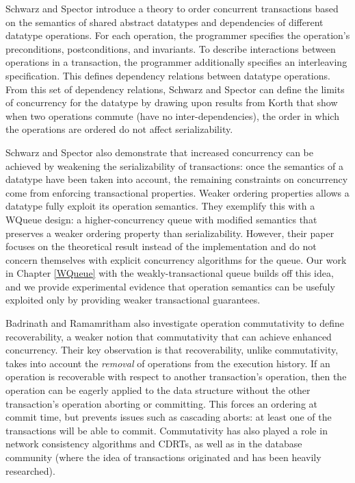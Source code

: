 Schwarz and Spector\cite{schwarz} introduce a theory to order concurrent transactions based on the semantics of shared abstract datatypes and dependencies of different datatype operations. For each operation, the programmer specifies the operation's preconditions, postconditions, and invariants. To describe interactions between operations in a transaction, the programmer additionally specifies an interleaving specification. This defines dependency relations between datatype operations. From this set of dependency relations, Schwarz and Spector can define the limits of concurrency for the datatype by drawing upon results from Korth\cite{korth} that show when two operations commute (have no inter-dependencies), the order in which the operations are ordered do not affect serializability. 

Schwarz and Spector also demonstrate that increased concurrency can be achieved by weakening the serializability of transactions: once the semantics of a datatype have been taken into account, the remaining constraints on concurrency come from enforcing transactional properties\cite{kung}. Weaker ordering properties allows a datatype fully exploit its operation semantics. They exemplify this with a WQueue design: a higher-concurrency queue with modified semantics that preserves a weaker ordering property than serializability. However, their paper focuses on the theoretical result instead of the implementation and do not concern themselves with explicit concurrency algorithms for the queue. Our work in Chapter \ref{WQueue} with the weakly-transactional queue builds off this idea, and we provide experimental evidence that operation semantics can be usefuly exploited only by providing weaker transactional guarantees.

Badrinath and Ramamritham\cite{badrinath} also investigate operation commutativity to define recoverability, a weaker notion that commutativity that can achieve enhanced concurrency. Their key observation is that recoverability, unlike commutativity, takes into account the \emph{removal} of operations from the execution history. If an operation is recoverable with respect to another transaction's operation, then the operation can be eagerly applied to the data structure without the other transaction's operation aborting or committing. This forces an ordering at commit time, but prevents issues such as cascading aborts: at least one of the transactions will be able to commit. Commutativity has also played a role in network consistency algorithms and CDRTs\cite{CRDT}, as well as in the database community (where the idea of transactions originated and has been heavily researched).

